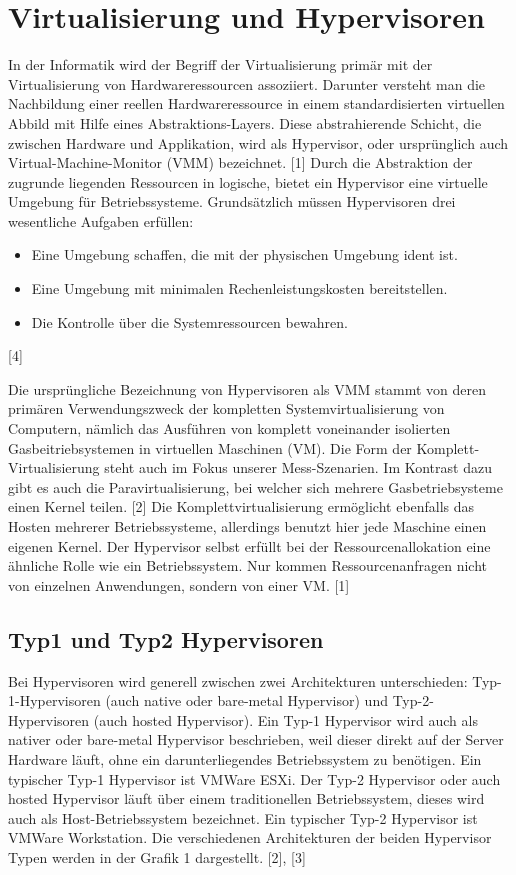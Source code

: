 \documentclass[conference]{IEEEtran}
\begin{document}
\section{Virtualisierung und Hypervisoren}
\label{Virtualisierung und Hypervisoren}	
In der Informatik wird der Begriff der Virtualisierung primär mit der Virtualisierung von Hardwareressourcen assoziiert. Darunter versteht man die Nachbildung einer reellen Hardwareressource in einem standardisierten virtuellen Abbild mit Hilfe eines Abstraktions-Layers. Diese abstrahierende Schicht, die zwischen Hardware und Applikation, wird als Hypervisor, oder ursprünglich auch Virtual-Machine-Monitor (VMM) bezeichnet. [1] Durch die Abstraktion der zugrunde liegenden Ressourcen in logische, bietet ein Hypervisor eine virtuelle Umgebung für Betriebssysteme. Grundsätzlich müssen Hypervisoren drei wesentliche Aufgaben erfüllen: 
\begin{itemize}
	\item Eine Umgebung schaffen, die mit der physischen Umgebung ident ist. 
	\item Eine Umgebung mit minimalen Rechenleistungskosten bereitstellen. 
	\item Die Kontrolle über die Systemressourcen bewahren. 
\end{itemize}
[4]

Die ursprüngliche Bezeichnung von Hypervisoren als VMM stammt von deren primären Verwendungszweck der kompletten Systemvirtualisierung von Computern, nämlich das Ausführen von komplett voneinander isolierten Gasbeitriebsystemen in virtuellen Maschinen (VM). Die Form der Komplett-Virtualisierung steht auch im Fokus unserer Mess-Szenarien. Im Kontrast dazu gibt es auch die Paravirtualisierung, bei welcher sich mehrere Gasbetriebsysteme einen Kernel teilen. [2] Die Komplettvirtualisierung ermöglicht ebenfalls das Hosten mehrerer Betriebssysteme, allerdings benutzt hier jede Maschine einen eigenen Kernel. Der Hypervisor selbst erfüllt bei der Ressourcenallokation eine ähnliche Rolle wie ein Betriebssystem. Nur kommen Ressourcenanfragen nicht von einzelnen Anwendungen, sondern von einer VM. [1]

\subsection{Typ1 und Typ2 Hypervisoren}
Bei Hypervisoren wird generell zwischen zwei Architekturen unterschieden: Typ-1-Hypervisoren (auch native oder bare-metal Hypervisor) und Typ-2-Hypervisoren (auch hosted Hypervisor). Ein Typ-1 Hypervisor wird auch als nativer oder bare-metal Hypervisor beschrieben, weil dieser direkt auf der Server Hardware läuft, ohne ein darunterliegendes Betriebssystem zu benötigen. Ein typischer Typ-1 Hypervisor ist VMWare ESXi. Der Typ-2 Hypervisor oder auch hosted Hypervisor läuft über einem traditionellen Betriebssystem, dieses wird auch als Host-Betriebssystem bezeichnet. Ein typischer Typ-2 Hypervisor ist VMWare Workstation. Die verschiedenen Architekturen der beiden Hypervisor Typen werden in der Grafik 1 dargestellt. [2], [3] 
\end{document}
